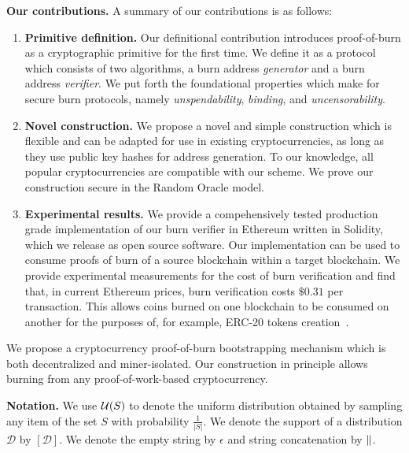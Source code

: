 \noindent
\textbf{Our contributions.}
A summary of our contributions is as follows:
\begin{enumerate}[wide, labelwidth=!, labelindent=0pt, label=(\roman*)]
    \item \textbf{Primitive definition.} Our definitional contribution introduces proof-of-burn as a cryptographic primitive for the first time. We
    define it as a protocol which consists of two algorithms, a burn address \emph{generator} and a burn address \emph{verifier}. We put forth the foundational properties which make for secure burn protocols, namely \emph{unspendability}, \emph{binding}, and \emph{uncensorability}.
    \item \textbf{Novel construction.} We propose a novel and simple construction which is flexible and can be adapted for use in existing cryptocurrencies, as long as they use public key hashes for address generation. To our knowledge, all popular cryptocurrencies are
    compatible with our scheme. We prove our construction secure in the Random Oracle model.
    \item \textbf{Experimental results.} We provide a compehensively tested production grade implementation of our burn verifier in Ethereum
    written in Solidity, which we release as open source software. Our implementation can be used to consume proofs of burn of a source blockchain
    within a target blockchain. We provide experimental measurements for the cost of burn verification and find that, in current Ethereum prices,
    burn verification costs $\$0.31$ per transaction.
    This allows coins burned on one blockchain to be consumed on another for the purposes of, for example, ERC-20 tokens creation~\cite{erc20}.
\end{enumerate}

We propose a cryptocurrency proof-of-burn bootstrapping mechanism which is both
decentralized and miner-isolated. Our construction in principle allows burning
from any proof-of-work-based cryptocurrency.

\noindent
\textbf{Notation.} We use $\mathcal{U}(S)$ to denote the uniform distribution
obtained by sampling any item of the set $S$ with probability $\frac{1}{|S|}$.
We denote the support of a distribution $\mathcal{D}$ by $[\mathcal{D}]$.
We denote the empty string by $\epsilon$ and string concatenation by $\mathbin{\|}$.
